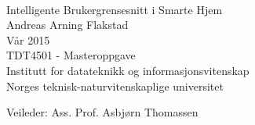 \thispagestyle{empty}
\mbox{}\\[6pc]
\begin{center}

\Huge{Intelligente Brukergrensesnitt i Smarte Hjem}\\[4pc]

\Large{Andreas Arning Flakstad}\\[1pc]
\large{Vår 2015}\\[2pc]

TDT4501 - Masteroppgave\\
Institutt for datateknikk og informasjonsvitenskap\\
Norges teknisk-naturvitenskaplige universitet
\end{center}
\vfill

\noindent Veileder: Ass. Prof. Asbjørn Thomassen


